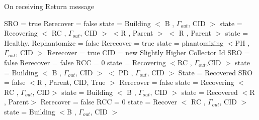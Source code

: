 	
\begin{algorithm}[H]
\caption{On receiving Return message}
\label{ Done message received}
\scriptsize
\begin{algorithmic}[1]
  \State SRO = true
\EndIf
{}
		\State Rerecover = false
			\State state = Building			
			\State $<$ B , $\Gamma_{out}$, CID $>$
		\Else
			\State state = Recovering
			\State $<$ RC , $\Gamma_{out}$, CID $>$
		\EndIf
	\Else
		\State $<$R , Parent $>$
	\EndIf
\EndIf
{}
			\State $<$ R , Parent $>$
		\EndIf
		\State state = Healthy.
	\Else
		\State Rephantomize = false 
		\State Rerecover = true
		\State state = phantomizing
		\State $<$PH , $\Gamma_{out}$, CID $>$
	\EndIf
\EndIf
{}
				\State Rerecover = true
	  \State CID = new Slightly Higher Collector Id
				\State SRO = false
			\EndIf
				\State Rerecover = false
				\State RCC = 0
					\State state = Recovering
					\State $<$RC , $\Gamma_{out}$,CID $>$
				\Else
					\State state = Building
					\State $<$ B , $\Gamma_{out}$, CID $>$
				\EndIf
				\State $<$ PD , $\Gamma_{out}$, CID $>$
			\EndIf
		\Else
				\State State = Recovered
				\State SRO = false
				\State $<$R , Parent, CID, True $>$
				\State Rerecover = false
					\State state = Recovering
					\State $<$ RC , $\Gamma_{out}$, CID$>$
					\State state = Building
					\State $<$ B , $\Gamma_{out}$, CID $>$
				\EndIf
				\State state = Recovered
				\State $<$R , Parent$>$
			\EndIf
		\EndIf
			\State Rerecover = false
				\State RCC = 0
			\EndIf
				\State state = Recover
				\State $<$ RC , $\Gamma_{out}$, CID $>$
				\State state = Building
				\State $<$B , $\Gamma_{out}$, CID $>$
			\EndIf
		\EndIf
	\EndIf
\EndIf
\EndProcedure
\end{algorithmic}
\end{algorithm}	


